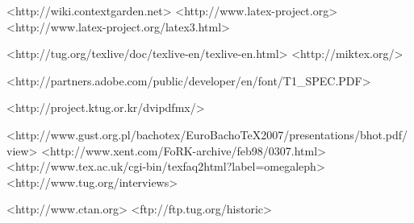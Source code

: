 \documentclass{scrartcl}
\begin{document}
	<http://wiki.contextgarden.net>
	<http://www.latex-project.org>
	<http://www.latex-project.org/latex3.html>
	
	<http://tug.org/texlive/doc/texlive-en/texlive-en.html>
	<http://miktex.org/>

	<http://partners.adobe.com/public/developer/en/font/T1_SPEC.PDF>

	<http://project.ktug.or.kr/dvipdfmx/>
	
	  <http://www.gust.org.pl/bachotex/EuroBachoTeX2007/presentations/bhot.pdf/view>
	<http://www.xent.com/FoRK-archive/feb98/0307.html>
	<http://www.tex.ac.uk/cgi-bin/texfaq2html?label=omegaleph>
	<http://www.tug.org/interviews>
	
	<http://www.ctan.org>
	<ftp://ftp.tug.org/historic>

\label{sec:text}
\end{document}
